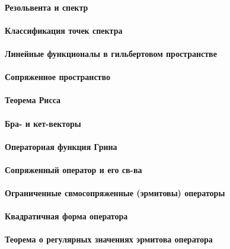 \documentclass[russian,twocolumn]{article}
\begin{document}
\paragraph{Резольвента и спектр}

\paragraph{Классификация точек спектра}

\paragraph{Линейные функционалы в гильбертовом пространстве}

\paragraph{Сопряженное пространство}

\paragraph{Теорема Рисса}

\paragraph{Бра- и кет-векторы}

\paragraph{Операторная функция Грина}

\paragraph{Сопряженный оператор и его св-ва}

\paragraph{Ограниченные свмосопряженные (эрмитовы) операторы}

\paragraph{Квадратичная форма оператора}

\paragraph{Теорема о регулярных значениях эрмитова оператора}
\end{document}
